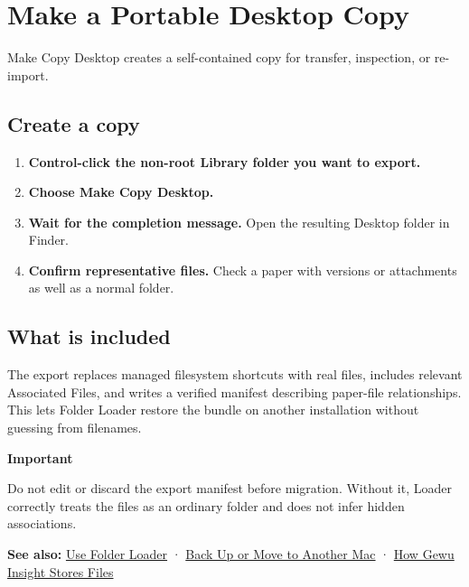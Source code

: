 \documentclass[10pt,letterpaper,oneside]{scrreprt}
\providecommand{\tightlist}{\setlength{\itemsep}{1pt}\setlength{\parskip}{0pt}}
\newenvironment{GewuRelated}{\par\nobreak\vspace{3pt}\nobreak\begingroup\small\sffamily\begin{samepage}\noindent}{\par\end{samepage}\endgroup}
\newenvironment{GewuLead}
  {\begin{list}{}{\leftmargin=0pt\rightmargin=0pt\topsep=0pt\partopsep=0pt\parsep=0pt}\item\relax
    \sffamily\fontsize{10.5}{13.2}\selectfont\color{GewuMuted}}
  {\end{list}}
\renewenvironment{quote}
  {\Needspace{5\baselineskip}\begin{tcolorbox}[enhanced,breakable,colback=GewuPale,colframe=GewuPale,boxrule=0pt,
    borderline west={1.6pt}{0pt}{GewuBlue},arc=1.2mm,left=2.5mm,right=2.5mm,top=1.7mm,bottom=1.7mm,
    before skip=4pt,after skip=5pt,fontupper=\color{GewuInk}\small]}
  {\end{tcolorbox}}
\begin{document}
\section{Make a Portable Desktop Copy}\label{desktop-copy}

\begin{GewuLead}
Make Copy Desktop creates a self-contained copy for transfer, inspection, or re-import.
\end{GewuLead}

\subsection{Create a copy}\label{create-a-copy}

\begin{enumerate}
\tightlist
\item
  \textbf{Control-click the non-root Library folder you want to export.}
\item
  \textbf{Choose \textbf{Make Copy Desktop}.}
\item
  \textbf{Wait for the completion message.} Open the resulting Desktop folder in Finder.
\item
  \textbf{Confirm representative files.} Check a paper with versions or attachments as well as a normal folder.
\end{enumerate}

\subsection{What is included}\label{what-is-included}

The export replaces managed filesystem shortcuts with real files, includes relevant Associated Files, and writes a verified manifest describing paper-file relationships. This lets Folder Loader restore the bundle on another installation without guessing from filenames.

\begin{quote}
\textbf{Important}

Do not edit or discard the export manifest before migration. Without it, Loader correctly treats the files as an ordinary folder and does not infer hidden associations.
\end{quote}

\begin{GewuRelated}
\textbf{See also:} \hyperref[folder-loader]{Use Folder Loader} · \hyperref[backup-migrate]{Back Up or Move to Another Mac} · \hyperref[storage-model]{How Gewu Insight Stores Files}
\end{GewuRelated}
\end{document}
